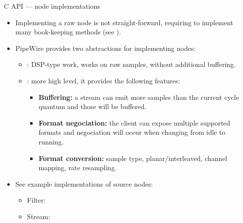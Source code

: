 \begin{frame}{C API — node implementations}
  \begin{itemize}

  \item Implementing a raw node is not straight-forward, requiring to
    implement many book-keeping methods (see ).

  \item PipeWire provides two abstractions for implementing nodes:

    \begin{itemize}

    \item {}: DSP-type work, works on raw 
      samples, without additional buffering.

    \item {}: more high level, it provides the following
      features:
      \begin{itemize}
      \item \textbf{Buffering:} a stream can emit more samples than
        the current cycle quantum and those will be buffered.
      \item \textbf{Format negociation:} the client can expose multiple
        supported formats and negociation will occur when changing from
        idle to running.
      \item \textbf{Format conversion:} sample type, planar/interleaved,
        channel mapping, rate resampling.
      \end{itemize}

    \end{itemize}

  \item See example implementations of source nodes:
    \begin{itemize}
    \item Filter: 
    \item Stream: 
    \end{itemize}

  \end{itemize}
\end{frame}



